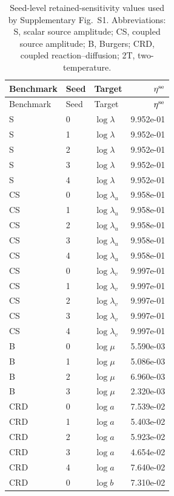 \documentclass[preprint,12pt]{elsarticle}
\newcommand{\etalow}{\eta^{\rm se}}
\begin{document}
\begin{landscape}
\begingroup
\small
\setlength{\tabcolsep}{5pt}
\renewcommand{\arraystretch}{1.05}
\begin{longtable}{lllr}
\caption{Seed-level retained-sensitivity values used by Supplementary Fig.~S1.  Abbreviations: S, scalar source amplitude; CS, coupled source amplitude; B, Burgers; CRD, coupled reaction--diffusion; 2T, two-temperature.}
\label{tab:s5_seed_eta}\\
\toprule
Benchmark & Seed & Target & $\etalow$ \\
\midrule
\endfirsthead
\toprule
Benchmark & Seed & Target & $\etalow$ \\
\midrule
\endhead
S & 0 & $\log\lambda$ & 9.952e-01 \\
S & 1 & $\log\lambda$ & 9.952e-01 \\
S & 2 & $\log\lambda$ & 9.952e-01 \\
S & 3 & $\log\lambda$ & 9.952e-01 \\
S & 4 & $\log\lambda$ & 9.952e-01 \\
CS & 0 & $\log\lambda_u$ & 9.958e-01 \\
CS & 1 & $\log\lambda_u$ & 9.958e-01 \\
CS & 2 & $\log\lambda_u$ & 9.958e-01 \\
CS & 3 & $\log\lambda_u$ & 9.958e-01 \\
CS & 4 & $\log\lambda_u$ & 9.958e-01 \\
CS & 0 & $\log\lambda_v$ & 9.997e-01 \\
CS & 1 & $\log\lambda_v$ & 9.997e-01 \\
CS & 2 & $\log\lambda_v$ & 9.997e-01 \\
CS & 3 & $\log\lambda_v$ & 9.997e-01 \\
CS & 4 & $\log\lambda_v$ & 9.997e-01 \\
B & 0 & $\log\mu$ & 5.590e-03 \\
B & 1 & $\log\mu$ & 5.086e-03 \\
B & 2 & $\log\mu$ & 6.960e-03 \\
B & 3 & $\log\mu$ & 2.320e-03 \\
CRD & 0 & $\log a$ & 7.539e-02 \\
CRD & 1 & $\log a$ & 5.403e-02 \\
CRD & 2 & $\log a$ & 5.923e-02 \\
CRD & 3 & $\log a$ & 4.654e-02 \\
CRD & 4 & $\log a$ & 7.640e-02 \\
CRD & 0 & $\log b$ & 7.310e-02 \\

\end{longtable}
\end{landscape}
\end{document}
